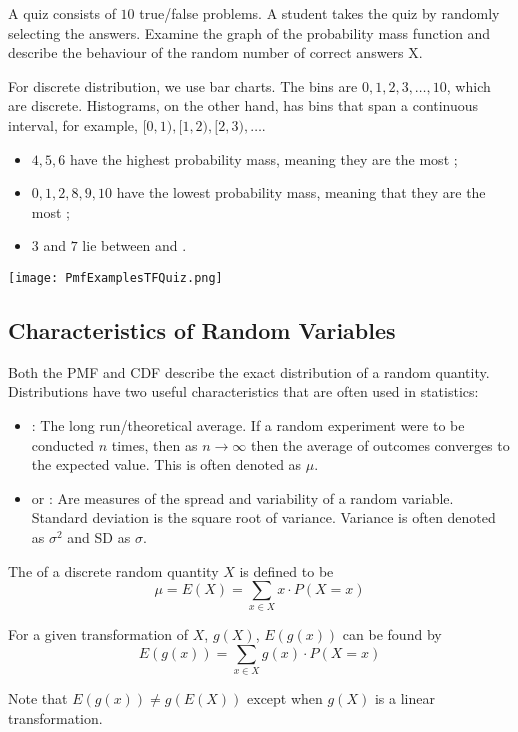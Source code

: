 \begin{example}
    A quiz consists of $10$ true/false problems. A student takes the quiz by randomly selecting the answers. Examine the graph of the probability mass function and describe the behaviour of the random number of correct answers X.

    For discrete distribution, we use bar charts. The bins are $0, 1, 2, 3, \dots, 10$, which are discrete. Histograms, on the other hand, has bins that span a continuous interval, for example, $[0, 1), [1, 2), [2, 3), \dots$. 

    \begin{itemize}
        \item $4, 5, 6$ have the highest probability mass, meaning they are the most ; 
        \item $0, 1, 2, 8, 9, 10$ have the lowest probability mass, meaning that they are the most ;
        \item $3$ and $7$ lie between  and .
    \end{itemize}

    \begin{center} \texttt{[image: PmfExamplesTFQuiz.png]} \end{center}
\end{example}

\subsection{Characteristics of Random Variables}

Both the PMF and CDF describe the exact distribution of a random quantity. Distributions have two useful characteristics that are often used in statistics:

\begin{itemize}
    \item {}: The long run/theoretical average. If a random experiment were to be conducted $n$ times, then as $n \to \infty$ then the average of outcomes converges to the expected value. This is often denoted as $\mu$.
    \item {} or : Are measures of the spread and variability of a random variable. Standard deviation is the square root of variance. Variance is often denoted as $\sigma^2$ and SD as $\sigma$.
\end{itemize}

\begin{definition}
    The  of a discrete random quantity $X$ is defined to be $$\mu = E(X) = \sum_{x \in X} x \cdot P(X = x)$$

    For a given transformation of $X$, $g(X)$, $E(g(x))$ can be found by $$E(g(x)) = \sum_{x \in X} g(x) \cdot P(X = x)$$

    Note that $E(g(x)) \neq g(E(X))$ except when $g(X)$ is a linear transformation. 
\end{definition}

